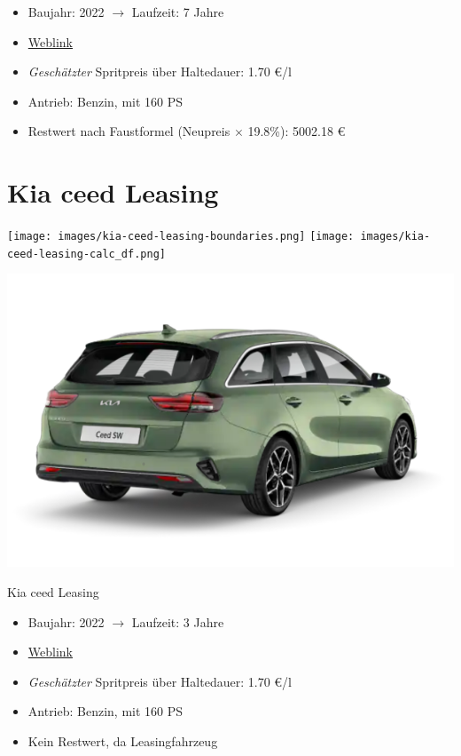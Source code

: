 \documentclass[landscape, DIV=99, 14pt]{scrartcl}
\begin{document}
\begin{itemize}
    \item Baujahr: 2022 $\rightarrow$ Laufzeit: 7 Jahre
    \item \href{https://konfigurator.meinauto.de/kia/neuwagen/cee-d/angebote/cee-d-sporty-wagon/konfigurator/\#!/extras/spirit/8865371/3,11,27/private/109347-4167-291321/1321/61d21ce73c5db/cash-purchase/109348-8088-291322/48,0,10000,0,0,0,0,0,}{Weblink}
    \item \emph{Gesch\"atzter} Spritpreis \"uber Haltedauer: 1.70 \euro{}/l
    \item Antrieb: Benzin, mit 160 PS
    \item Restwert nach Faustformel (Neupreis $\times$ 19.8\%): 5002.18 \euro{}
\end{itemize}

\pagebreak


\twocolumn

\section*{Kia ceed Leasing}
\begin{center}
\texttt{[image: images/kia-ceed-leasing-boundaries.png]}
\null
\vspace{0.5cm}
\texttt{[image: images/kia-ceed-leasing-calc\_df.png]}
\end{center}

\pagebreak
\null
\vspace{2cm}
\begin{center}
\includegraphics[width=0.9\columnwidth]{cars/kia-ceed-sportswagon-leasing.png}

Kia ceed Leasing
\end{center}

\begin{itemize}
    \item Baujahr: 2022 $\rightarrow$ Laufzeit: 3 Jahre
    \item \href{https://konfigurator.meinauto.de/kia/neuwagen/cee-d/angebote/cee-d-sporty-wagon/konfigurator/\#!/extras/spirit/8865371/3,11,27/private/109347-4167-291321/1321/61d21ce73c5db/leasing/109348-8088-291322/36,3000,15000,0,0,0,0,0,}{Weblink}
    \item \emph{Gesch\"atzter} Spritpreis \"uber Haltedauer: 1.70 \euro{}/l
    \item Antrieb: Benzin, mit 160 PS
    \item Kein Restwert, da Leasingfahrzeug
\end{itemize}
\end{document}
